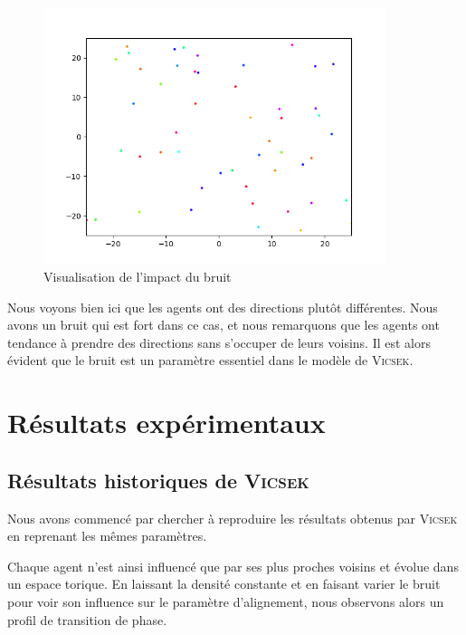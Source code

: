 \documentclass[french, a4paper, 12pt, openany]{report}
\begin{document}
   \begin{figure}[!h]
		\centering
		\includegraphics[width=10cm]{images/image_10.png}
		\caption{Visualisation de l'impact du bruit}
		\label{bruit}
	\end{figure}  

	
Nous voyons bien ici que les agents ont des directions plutôt différentes. Nous avons un bruit qui est fort dans ce cas, et nous remarquons que les agents ont tendance à prendre des directions sans s'occuper de leurs voisins. Il est alors évident que le bruit est un paramètre essentiel dans le modèle de \textsc{Vicsek}.
   
\chapter{Résultats expérimentaux}
\section{Résultats historiques de \textsc{Vicsek}}
	Nous avons commencé par chercher à reproduire les résultats obtenus par \textsc{Vicsek} en reprenant les mêmes paramètres.
	
	Chaque agent n'est ainsi influencé que par ses plus proches voisins et évolue dans un espace torique. En laissant la densité constante et en faisant varier le bruit pour voir son influence sur le paramètre d'alignement, nous observons alors un profil de transition de phase.
	
\end{document}

